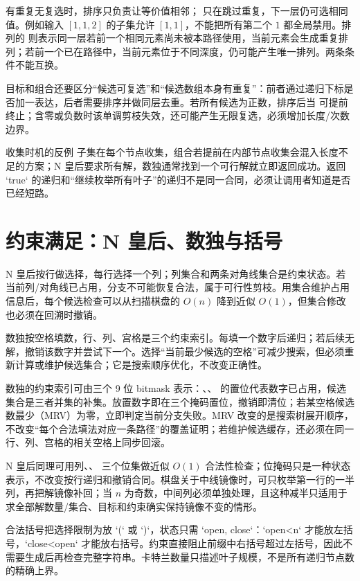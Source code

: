 \documentclass[UTF8,fontset=none,11pt,a4paper]{ctexart}
\begin{document}
有重复无复选时，排序只负责让等价值相邻； 只在跳过重复，下一层仍可选相同值。例如输入 $[1,1,2]$ 的子集允许 $[1,1]$，不能把所有第二个 $1$ 都全局禁用。排列的  则表示同一层若前一个相同元素尚未被本路径使用，当前元素会生成重复排列；若前一个已在路径中，当前元素位于不同深度，仍可能产生唯一排列。两条条件不能互换。

目标和组合还要区分“候选可复选”和“候选数组本身有重复”：前者通过递归下标是否加一表达，后者需要排序并做同层去重。若所有候选为正数，排序后当  可提前终止；含零或负数时该单调剪枝失效，还可能产生无限复选，必须增加长度/次数边界。

\begin{warnbox}{收集时机的反例}
子集在每个节点收集，组合若提前在内部节点收集会混入长度不足的方案；N 皇后要求所有解，数独通常找到一个可行解就立即返回成功。返回 `true` 的递归和“继续枚举所有叶子”的递归不是同一合同，必须让调用者知道是否已经短路。
\end{warnbox}

\section{约束满足：N 皇后、数独与括号}

N 皇后按行做选择，每行选择一个列；列集合和两条对角线集合是约束状态。若当前列/对角线已占用，分支不可能恢复合法，属于可行性剪枝。用集合维护占用信息后，每个候选检查可以从扫描棋盘的 $O(n)$ 降到近似 $O(1)$，但集合修改也必须在回溯时撤销。

数独按空格填数，行、列、宫格是三个约束索引。每填一个数字后递归；若后续无解，撤销该数字并尝试下一个。选择“当前最少候选的空格”可减少搜索，但必须重新计算或维护候选集合；它是搜索顺序优化，不改变正确性。

数独的约束索引可由三个 9 位 bitmask 表示：、、 的置位代表数字已占用，候选集合是三者并集的补集。放置数字即在三个掩码置位，撤销即清位；若某空格候选数最少（MRV）为零，立即判定当前分支失败。MRV 改变的是搜索树展开顺序，不改变“每个合法填法对应一条路径”的覆盖证明；若维护候选缓存，还必须在同一行、列、宫格的相关空格上同步回滚。

N 皇后同理可用列、、 三个位集做近似 $O(1)$ 合法性检查；位掩码只是一种状态表示，不改变按行递归和撤销合同。棋盘关于中线镜像时，可只枚举第一行的一半列，再把解镜像补回；当 $n$ 为奇数，中间列必须单独处理，且这种减半只适用于求全部解数量/集合、目标和约束确实保持镜像不变的情形。

合法括号把选择限制为放 `(` 或 `)`，状态只需 `open, close`：`open<n` 才能放左括号，`close<open` 才能放右括号。约束直接阻止前缀中右括号超过左括号，因此不需要生成后再检查完整字符串。卡特兰数量只描述叶子规模，不是所有递归节点数的精确上界。
\end{document}
